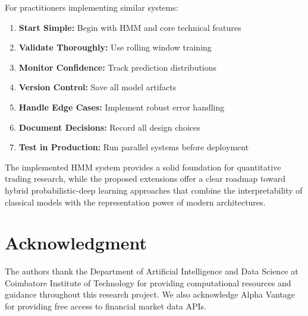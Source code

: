 \documentclass[conference]{IEEEtran}
\begin{document}
For practitioners implementing similar systems:
\begin{enumerate}
\item \textbf{Start Simple:} Begin with HMM and core technical features
\item \textbf{Validate Thoroughly:} Use rolling window training
\item \textbf{Monitor Confidence:} Track prediction distributions
\item \textbf{Version Control:} Save all model artifacts
\item \textbf{Handle Edge Cases:} Implement robust error handling
\item \textbf{Document Decisions:} Record all design choices
\item \textbf{Test in Production:} Run parallel systems before deployment
\end{enumerate}

The implemented HMM system provides a solid foundation for quantitative trading research, while the proposed extensions offer a clear roadmap toward hybrid probabilistic-deep learning approaches that combine the interpretability of classical models with the representation power of modern architectures.

\section*{Acknowledgment}
The authors thank the Department of Artificial Intelligence and Data Science at Coimbatore Institute of Technology for providing computational resources and guidance throughout this research project. We also acknowledge Alpha Vantage for providing free access to financial market data APIs.
\end{document}
